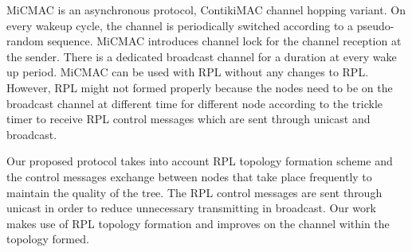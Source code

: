 MiCMAC \cite{micmac} is an asynchronous protocol, ContikiMAC \cite{contikimac} channel hopping variant. On every wakeup cycle, the channel is periodically switched according to a pseudo-random sequence. MiCMAC introduces channel lock for the channel reception at the sender. There is a dedicated broadcast channel for a duration at every wake up period. MiCMAC can be used with RPL without any changes to RPL. However, RPL might not formed properly because the nodes need to be on the broadcast channel at different time for different node according to the trickle timer to receive RPL control messages which are sent through unicast and broadcast.

Our proposed protocol takes into account RPL topology formation scheme and the control messages exchange between nodes that take place frequently to maintain the quality of the tree. The RPL control messages are sent through unicast in order to reduce unnecessary transmitting in broadcast. Our work makes use of RPL topology formation and improves on the channel within the topology formed.




